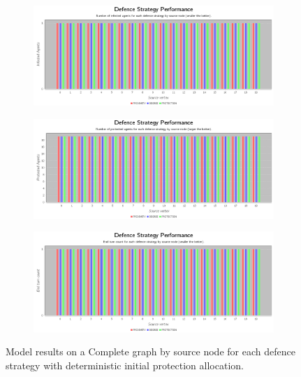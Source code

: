 \documentclass[results.tex]{subfiles}
\begin{document}
\begin{figure}[!ht]
\centering
     \begin{subfigure}[b]{0.9\textwidth}
         \centering
         \includegraphics[width=\textwidth]{Deterministic/DeterministicInfectedChart}
         \label{fig:com-det-infected}
     \end{subfigure}
     \vfill
     \begin{subfigure}[b]{0.9\textwidth}
         \centering
         \includegraphics[width=\textwidth]{Deterministic/DeterministicProtectedChart}
         \label{fig:com-det-protected}
     \end{subfigure}
     \vfill
     \begin{subfigure}[b]{0.9\textwidth}
         \centering
         \includegraphics[width=\textwidth]{Deterministic/DeterministicEndTurnChart}
         \label{fig:com-det-end}
     \end{subfigure}
        \caption{Model results on a Complete graph by source node for each defence strategy with deterministic initial protection allocation.}
        \label{fig:com-det-charts}
\end{figure}
\end{document}

